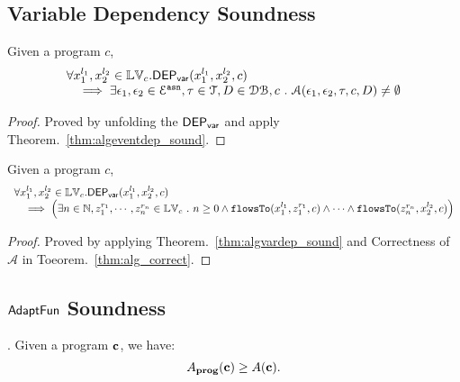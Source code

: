 %
\subsection{Variable Dependency Soundness}
\begin{thm}
\label{thm:algvardep_sound}
Given a program ${c}$, 
\[
\begin{array}{l}
  \forall {x}_1^{l_1}, {x}_2^{l_2} \in \mathbb{LV}_{{c}}.
  \mathsf{DEP_{var}}({x}_1^{l_1}, {x}_2^{l_2}, {c})
  \\ \quad \implies \exists \mathtt{\epsilon}_1, \mathtt{\epsilon}_2 \in \mathcal{E}^{\mathtt{{asn}}}, \mathtt{\tau} \in \mathcal{T}, D \in \mathcal{DB} , c ~.~
  \mathcal{A}(\mathtt{\epsilon}_1, \mathtt{\epsilon}_2, \mathtt{\tau}, c, D) \neq \emptyset
\end{array}
\]
\end{thm}
\begin{proof}
Proved by unfolding the $\mathsf{DEP_{var}}$ and apply Theorem.~\ref{thm:algeventdep_sound}.
\end{proof}
%
\begin{thm}
\label{thm:flowstovardep_sound}
Given a program ${c}$, 
\[
\begin{array}{l}
  \forall {x}_1^{l_1}, {x}_2^{l_2} \in \mathbb{LV}_{{c}}.
  \mathsf{DEP_{var}}({x}_1^{l_1}, {x}_2^{l_2}, {c})
  \\ \quad \implies
  \Big( \exists n \in \mathbb{N}, z_1^{r_1}, \cdots, z_n^{r_n} \in \mathbb{LV}_{{c}} ~.~ n \geq 0 \land
  \mathtt{flowsTo}(x_1^{l_1}, z_1^{r_1}, c) 
  \land \cdots \land \mathtt{flowsTo}(z_n^{r_n}, {x}_2^{l_2}, c) \Big)
\end{array}
\]
\end{thm}
\begin{proof}
Proved by applying Theorem.~\ref{thm:algvardep_sound} and Correctness of $\mathcal{A}$ in Toeorem.~\ref{thm:alg_correct}.
\end{proof}

\subsection{$\textsf{AdaptFun}$ Soundness}
{
  \begin{thm}.
  Given a program ${\boldsymbol{\mathbf{c}}}$, we have:
  \[
  A_{\bf{prog}}({\boldsymbol{\mathbf{c}}}) \geq A({\boldsymbol{\mathbf{c}}}).
  \]
  \end{thm}
}
